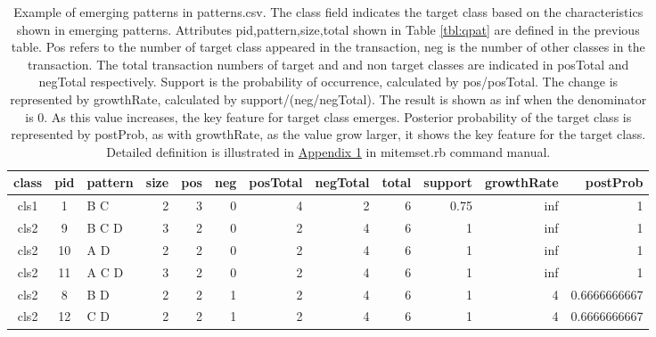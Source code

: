 \begin{table}[htbp]
\begin{center}
\begin{tabular}{cc}
\end{tabular} 
\end{center}
\end{table} 

\vspace{1em} 

\begin{table}[htbp]
\begin{center}
\caption{Example of emerging patterns in patterns.csv\label{tbl:qep_pat}.
The class field indicates the target class based on the characteristics shown in emerging patterns. 
Attributes pid,pattern,size,total shown in Table \ref{tbl:qpat} are defined in the previous table. 
Pos refers to the number of target class appeared in the transaction, neg is the number of other classes in the transaction.  
The total transaction numbers of target and and non target classes are indicated in posTotal and negTotal respectively. 
Support is the probability of occurrence, calculated by pos/posTotal.
The change is represented by growthRate, calculated by support/(neg/negTotal). 
The result is shown as inf when the denominator is 0.
As this value increases, the key feature for target class emerges. Posterior probability of the target class is represented by postProb, as with growthRate, as the value grow larger, it shows the key feature for the target class. Detailed definition is illustrated in  \hyperref[sect:ep]{Appendix 1} in mitemset.rb command manual. 
}
\vspace{1em} 
{\small
\begin{tabular}{cclrrrrrrrrr}
\hline
class&pid&pattern&size&pos&neg&posTotal&negTotal&total&support&growthRate&postProb\\
\hline
cls1&1&B C&2&3&0&4&2&6&0.75&inf&1\\
cls2&9&B C D&3&2&0&2&4&6&1&inf&1\\
cls2&10&A D&2&2&0&2&4&6&1&inf&1\\
cls2&11&A C D&3&2&0&2&4&6&1&inf&1\\
cls2&8&B D&2&2&1&2&4&6&1&4&0.6666666667\\
cls2&12&C D&2&2&1&2&4&6&1&4&0.6666666667\\
\hline
\end{tabular} 
}
\end{center}
\end{table} 

\vspace{1em} 

